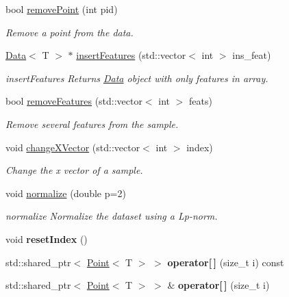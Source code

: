 \begin{DoxyCompactItemize}
bool \hyperlink{class_data_a92ad77892fa46016d890d4ef4954ef2f}{remove\+Point} (int pid)
\begin{DoxyCompactList}\small\item\em Remove a point from the data. \end{DoxyCompactList}\item 
\hyperlink{class_data}{Data}$<$ T $>$ $\ast$ \hyperlink{class_data_adfd307ae8437b7b2da4372eb604a2c43}{insert\+Features} (std\+::vector$<$ int $>$ ins\+\_\+feat)
\begin{DoxyCompactList}\small\item\em insert\+Features Returns \hyperlink{class_data}{Data} object with only features in array. \end{DoxyCompactList}\item 
bool \hyperlink{class_data_a574b881ce5042c5a13d79c187aa3f923}{remove\+Features} (std\+::vector$<$ int $>$ feats)
\begin{DoxyCompactList}\small\item\em Remove several features from the sample. \end{DoxyCompactList}\item 
void \hyperlink{class_data_a9cf86608e6a02b80c9755646d7cb55fb}{change\+X\+Vector} (std\+::vector$<$ int $>$ index)
\begin{DoxyCompactList}\small\item\em Change the x vector of a sample. \end{DoxyCompactList}\item 
void \hyperlink{class_data_a3271dd8204296537222ed74c5aab1a03}{normalize} (double p=2)
\begin{DoxyCompactList}\small\item\em normalize Normalize the dataset using a Lp-\/norm. \end{DoxyCompactList}\item 
void {\bfseries reset\+Index} ()\hypertarget{class_data_aae060f1a0ce3448b8e9b9f63d9ee4bbc}{}\label{class_data_aae060f1a0ce3448b8e9b9f63d9ee4bbc}

\item 
std\+::shared\+\_\+ptr$<$ \hyperlink{class_point}{Point}$<$ T $>$ $>$ {\bfseries operator\mbox{[}$\,$\mbox{]}} (size\+\_\+t i) const \hypertarget{class_data_a7a6bf3b41b151a201cabe2824817e579}{}\label{class_data_a7a6bf3b41b151a201cabe2824817e579}

\item 
std\+::shared\+\_\+ptr$<$ \hyperlink{class_point}{Point}$<$ T $>$ $>$ \& {\bfseries operator\mbox{[}$\,$\mbox{]}} (size\+\_\+t i)\hypertarget{class_data_ad2271c70b41bd9bab92a5f342fb1ea38}{}\label{class_data_ad2271c70b41bd9bab92a5f342fb1ea38}


\end{DoxyCompactItemize}
